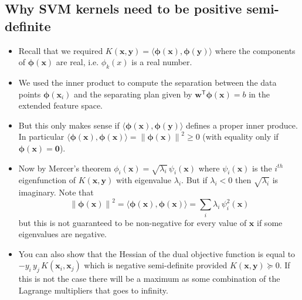 \documentclass[11pt]{article}
\newcommand{\tr}{\textsf{T}}
\newcommand{\len}[1]{\left\| #1 \right\|}
\begin{document}
\subsection{Why SVM kernels need to be positive semi-definite}
\label{sec:org96446be}
\begin{itemize}
\item Recall that we required \(K(\bm{x}, \bm{y}) = \langle
     \bm{\phi}(\bm{x}), \bm{\phi}(\bm{y}) \rangle\) where the
components of \(\bm{\phi}(\bm{x})\) are real, i.e.  \(\phi_{k}(x)\)
is a real number.
\item We used the inner product to compute the separation between the
data points \(\bm{\phi}(\bm{x}_{i})\) and the separating plan given by
\(\bm{w}^{\tr}\bm{\phi}(\bm{x}) =b\) in the extended feature space.
\item But this only makes sense if \(\langle \bm{\phi}(\bm{x}),
     \bm{\phi}(\bm{y}) \rangle\) defines a proper inner produce.  In
particular \(\langle \bm{\phi}(\bm{x}), \bm{\phi}(\bm{x}) \rangle
     = \len{\bm{\phi}(\bm{x})}^{2} \geq 0\) (with equality only if
\(\bm{\phi}(\bm{x})=\bm{0}\)).
\item Now by Mercer's theorem \(\phi_{i}(\bm{x}) =
     \sqrt{\lambda_{i}}\,\psi_{i}(\bm{x})\) where \(\psi_{i}(\bm{x})\) is
the \(i^{th}\) eigenfunction of \(K(\bm{x}, \bm{y})\) with
eigenvalue \(\lambda_{i}\).  But if \(\lambda_{i}<0\) then
\(\sqrt{\lambda_{i}}\) is imaginary.  Note that
$$\len{\bm{\phi}(\bm{x})}^{2} = \langle \bm{\phi}(\bm{x}),
     \bm{\phi}(\bm{x}) \rangle = \sum_{i} \lambda_{i}\,
     \psi_{i}^{2}(\bm{x})$$
but this is not guaranteed to be non-negative for every value of
\(\bm{x}\) if some eigenvalues are negative.
\item You can also show that the Hessian of the dual objective function
is equal to \(-y_{i}\,y_{j}\,K(\bm{x}_{i}, \bm{x}_{j})\) which is
negative semi-definite provided \(K(\bm{x},\bm{y})\succeq 0\).
If this is not the case there will be a maximum as some
combination of the Lagrange multipliers that goes to infinity.
\end{itemize}
\end{document}
